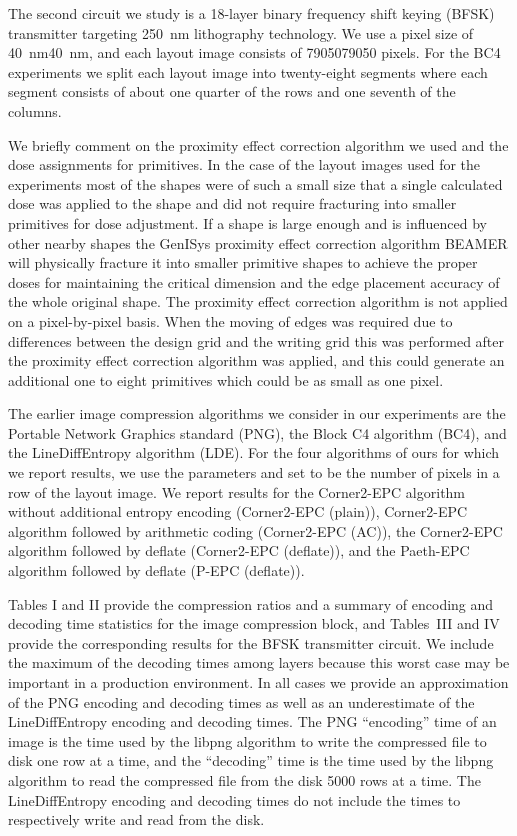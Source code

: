 \documentclass{article}
\begin{document}
The second circuit we study is a 18-layer binary frequency shift keying
(BFSK) transmitter targeting 250~nm lithography technology.
We use a pixel size of 40~nm40~nm, and each layout image consists of
7905079050 pixels.
For the BC4 experiments we split each layout image into twenty-eight segments
where each segment consists of about one quarter of the rows and
one seventh of the columns.

We briefly comment on the proximity effect correction algorithm we used
and the dose assignments for primitives. 
In the case of the layout images used for the experiments most of the shapes 
were of such a small size that a single calculated dose was applied to the 
shape and did not require fracturing into smaller primitives for dose 
adjustment.  If a shape is large enough and is influenced by other nearby 
shapes the GenISys proximity effect correction algorithm {\small BEAMER}
will physically fracture it into smaller primitive shapes to achieve the 
proper doses for maintaining the critical dimension and the edge placement 
accuracy of the whole original shape.  The proximity effect correction
algorithm is not applied on a pixel-by-pixel basis.  When the moving of 
edges was required due to differences between the design grid and the writing 
grid this was performed after the proximity effect correction algorithm was 
applied, and this could generate an additional one to eight primitives which 
could be as small as one pixel.

The earlier image compression algorithms we consider in our experiments are
the Portable Network Graphics standard (PNG),
the Block C4 algorithm (BC4), and
the LineDiffEntropy algorithm (LDE).
For the four algorithms of ours for which we report results, we 
use the parameters  and set  to be the number of pixels in a row of
the layout image.
We report results for
the Corner2-EPC algorithm without additional entropy encoding
(Corner2-EPC (plain)),
Corner2-EPC algorithm followed by arithmetic coding 
(Corner2-EPC (AC)),
the Corner2-EPC algorithm followed by deflate (Corner2-EPC (deflate)), and
the Paeth-EPC algorithm followed by deflate (P-EPC (deflate)).

Tables I and II provide the compression ratios and a summary of 
encoding and decoding time statistics for the image compression block,
and Tables~III and IV
provide the corresponding results for the BFSK transmitter circuit.
We include the maximum of the decoding times among layers because this worst 
case may be important in a production environment.
In all cases we provide an approximation of the PNG encoding and decoding 
times as well as an underestimate of
the LineDiffEntropy encoding and decoding times.  The PNG ``encoding'' time 
of an image is the time used by the libpng algorithm to write the 
compressed file to disk one row at a time, and the ``decoding'' time is the 
time used by the libpng algorithm to read the compressed file from the disk
5000 rows at a time.  The LineDiffEntropy
encoding and decoding times do not include the times to respectively write
and read from the disk.
\end{document}
